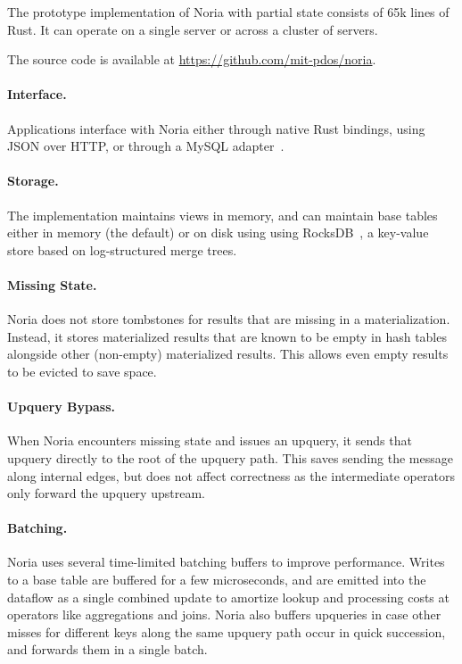 The prototype implementation of Noria with partial state consists of 65k lines
of Rust. It can operate on a single server or across a cluster of servers.

The source code is available at \url{https://github.com/mit-pdos/noria}.

\paragraph{Interface.}
Applications interface with Noria either through native Rust bindings, using
JSON over HTTP, or through a MySQL adapter~\cite{noria-mysql}.

\paragraph{Storage.}
The implementation maintains views in memory, and can maintain base tables
either in memory (the default) or on disk using using RocksDB~\cite{rocksdb}, a
key-value store based on log-structured merge trees.

\paragraph{Missing State.}
Noria does not store tombstones for results that are missing in a
materialization. Instead, it stores materialized results that are known to be
empty in hash tables alongside other (non-empty) materialized results. This
allows even empty results to be evicted to save space.

\paragraph{Upquery Bypass.}
When Noria encounters missing state and issues an upquery, it sends that
upquery directly to the root of the upquery path. This saves sending the
message along internal edges, but does not affect correctness as the
intermediate operators only forward the upquery upstream.

\paragraph{Batching.}
Noria uses several time-limited batching buffers to improve performance. Writes
to a base table are buffered for a few microseconds, and are emitted into the
dataflow as a single combined update to amortize lookup and processing costs at
operators like aggregations and joins. Noria also buffers upqueries in case
other misses for different keys along the same upquery path occur in quick
succession, and forwards them in a single batch.

